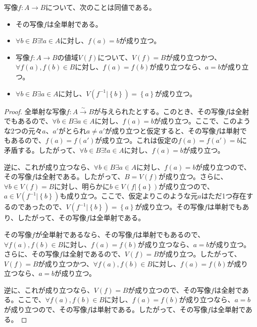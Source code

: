 \documentclass[dvipdfmx]{jsarticle}
\begin{document}
\begin{thm}
\label{1.2.3.10}
写像$f:A \rightarrow B$について、次のことは同値である。
\begin{itemize}
\item
  その写像$f$は全単射である。
\item
  $\forall b \in B\exists!a \in A$に対し、$f(a) = b$が成り立つ。
\item
  写像$f:A \rightarrow B$の値域$V(f)$について、$V(f) = B$が成り立つかつ、$\forall f(a),f(b) \in B$に対し、$f(a) = f(b)$が成り立つなら、$a = b$が成り立つ。
\item
  $\forall b \in B\exists a \in A$に対し、$V\left( f^{- 1}|\left\{ b \right\} \right) = \left\{ a \right\}$が成り立つ。
\end{itemize}
\end{thm}
\begin{proof}
全単射な写像$f:A\overset{\sim}{\rightarrow}B$が与えられたとする。このとき、その写像$f$は全射でもあるので、$\forall b \in B\exists a \in A$に対し、$f(a) = b$が成り立つ。ここで、このような2つの元々$a$、$a'$がとられ$a \neq a'$が成り立つと仮定すると、その写像$f$は単射でもあるので、$f(a) = f\left( a' \right)$が成り立つ。これは仮定の$f(a) = f\left( a' \right) = b$に矛盾する。したがって、$\forall b \in B\exists!a \in A$に対し、$f(a) = b$が成り立つ。\par
逆に、これが成り立つなら、$\forall b \in B\exists a \in A$に対し、$f(a) = b$が成り立つので、その写像$f$は全射である。したがって、$B = V(f)$が成り立つ。さらに、$\forall b \in V(f) = B$に対し、明らかに$b \in V\left( f|\left\{ a \right\} \right)$が成り立つので、$a \in V\left( f^{- 1}|\left\{ b \right\} \right)$も成り立つ。ここで、仮定よりこのような元$a$はただ1つ存在するのであったので、$V\left( f^{- 1}|\left\{ b \right\} \right) = \left\{ a \right\}$が成り立つ。その写像$f$は単射でもあり、したがって、その写像$f$は全単射である。\par
その写像$f$が全単射であるなら、その写像$f$は単射でもあるので、$\forall f(a),f(b) \in B$に対し、$f(a) = f(b)$が成り立つなら、$a = b$が成り立つ。さらに、その写像$f$は全射であるので、$V(f) = B$が成り立つ。したがって、$V(f) = B$が成り立つかつ、$\forall f(a),f(b) \in B$に対し、$f(a) = f(b)$が成り立つなら、$a = b$が成り立つ。\par
逆に、これが成り立つなら、$V(f) = B$が成り立つので、その写像$f$は全射である。ここで、$\forall f(a),f(b) \in B$に対し、$f(a) = f(b)$が成り立つなら、$a = b$が成り立つので、その写像$f$は単射である。したがって、その写像$f$は全単射である。\par

\end{proof}
\end{document}
